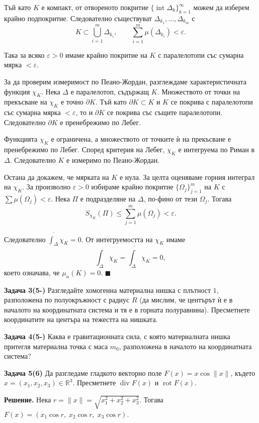 \documentclass[10pt]{article}
\begin{document}
Тъй като $K$ е компакт, от отвореното покритие $\{\operatorname{int}\Delta_k\}_{k=1}^\infty$ можем да изберем крайно подпокритие. Следователно съществуват $\Delta_{k_1},\dots,\Delta_{k_m}$ с
\[
K \subset \bigcup_{i=1}^m \Delta_{k_i}, \qquad \sum_{i=1}^m \mu(\Delta_{k_i}) < \varepsilon.
\]

Така за всяко $\varepsilon > 0$ имаме крайно покритие на $K$ с паралелотопи със сумарна мярка $<\varepsilon$.

За да проверим измеримост по Пеано-Жордан, разглеждаме характеристичната функция $\chi_K$. Нека $\Delta$ е паралелотоп, съдържащ $K$. Множеството от точки на прекъсване на $\chi_K$ е точно $\partial K$. Тъй като $\partial K \subset K$ и $K$ се покрива с паралелотопи със сумарна мярка $<\varepsilon$, то и $\partial K$ се покрива със същите паралелотопи. Следователно $\partial K$ е пренебрежимо по Лебег.

Функцията $\chi_K$ е ограничена, а множеството от точките ѝ на прекъсване е пренебрежимо по Лебег. Според критерия на Лебег, $\chi_K$ е интегруема по Риман в $\Delta$. Следователно $K$ е измеримо по Пеано-Жордан.

Остана да докажем, че мярката на $K$ е нула. За целта оценяваме горния интеграл на $\chi_K$. За произволно $\varepsilon > 0$ избираме крайно покритие $\{\Omega_j\}_{j=1}^m$ на $K$ с $\sum \mu(\Omega_j) < \varepsilon$. Нека $\Pi$ е подразделяне на $\Delta$, по-фино от тези $\Omega_j$. Тогава
\[
S_{\chi_K}(\Pi) \le \sum_{j=1}^m \mu(\Omega_j) < \varepsilon.
\]

Следователно $\overline{\int_\Delta} \chi_K = 0$. От интегруемостта на $\chi_K$ имаме
\[
\int_\Delta \chi_K = \overline{\int_\Delta} \chi_K = 0,
\]
което означава, че $\mu_n(K) = 0$. $\blacksquare$


\textbf{Задача 3(5-) }Разгледайте хомогенна материална нишка с плътност $1$, разположена по полуокръжност с радиус $R$ (да мислим, че центърът ѝ е в началото на координатната система и тя е в горната полуравнина). Пресметнете координатите на центъра на тежестта на нишката. 

\textbf{Задача 4(5-) }Каква е гравитационната сила, с която материалната нишка притегля материална точка с маса $m_0$, разположена в началото на координатната система?

\textbf{Задача 5(6) }Да разгледаме гладкото векторно поле $F(x) = x \cos\|x\|$, където $x = (x_1,x_2,x_3) \in \mathbb{R}^3$. Пресметнете $\operatorname{div} F(x)$ и $\operatorname{rot} F(x)$.

\textbf{Решение.} 
Нека $r = \|x\| = \sqrt{x_1^2 + x_2^2 + x_3^2}$. Тогава $F(x) = (x_1 \cos r,\; x_2 \cos r,\; x_3 \cos r)$.
\end{document}
